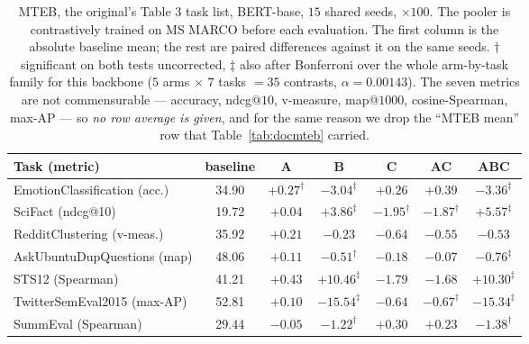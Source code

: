 \documentclass{article}
\begin{document}
\begin{table}[h]
\caption{MTEB, the original's Table 3 task list, BERT-base, $15$ shared seeds,
$\times100$. The pooler is contrastively trained on MS MARCO before each
evaluation. The first column is the absolute baseline mean; the rest are paired
differences against it on the same seeds. $\dagger$ significant on both tests
uncorrected, $\ddagger$ also after
Bonferroni over the whole arm-by-task family for this backbone
($5$ arms $\times$ $7$ tasks $=35$ contrasts, $\alpha=0.00143$). The seven
metrics are not
commensurable --- accuracy, ndcg@$10$, v-measure, map@$1000$, cosine-Spearman,
max-AP --- so \emph{no row average is given}, and for the same reason we drop
the ``MTEB mean'' row that Table~\ref{tab:docmteb} carried.}
\label{tab:mteb3}
\begin{center}
\footnotesize
\setlength{\tabcolsep}{4pt}
\begin{tabular}{lcccccc}
\toprule
Task (metric) & baseline & A & B & C & AC & ABC \\
\midrule
EmotionClassification (acc.)   & 34.90 & $+0.27^{\dagger}$ & $-3.04^{\ddagger}$ & $+0.26$ & $+0.39$ & $-3.36^{\ddagger}$ \\
SciFact (ndcg@10)              & 19.72 & $+0.04$ & $+3.86^{\ddagger}$ & $-1.95^{\dagger}$ & $-1.87^{\dagger}$ & $\mathbf{+5.57}^{\ddagger}$ \\
RedditClustering (v-meas.)     & 35.92 & $+0.21$ & $-0.23$ & $-0.64$ & $-0.55$ & $-0.53$ \\
AskUbuntuDupQuestions (map)    & 48.06 & $+0.11$ & $-0.51^{\dagger}$ & $-0.18$ & $-0.07$ & $-0.76^{\ddagger}$ \\
STS12 (Spearman)               & 41.21 & $+0.43$ & $\mathbf{+10.46}^{\ddagger}$ & $-1.79$ & $-1.68$ & $+10.30^{\ddagger}$ \\
TwitterSemEval2015 (max-AP)    & 52.81 & $+0.10$ & $\mathbf{-15.54}^{\ddagger}$ & $-0.64$ & $-0.67^{\dagger}$ & $-15.34^{\ddagger}$ \\
SummEval (Spearman)            & 29.44 & $-0.05$ & $-1.22^{\dagger}$ & $+0.30$ & $+0.23$ & $-1.38^{\dagger}$ \\
\bottomrule
\end{tabular}
\end{center}
\end{table}
\end{document}
